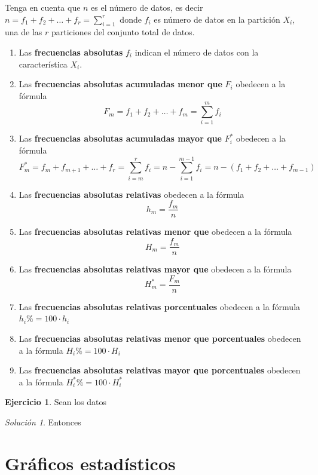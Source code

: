 \documentclass[10pt,]{krantz}
\theoremstyle{definition}
\theoremstyle{definition}
\theoremstyle{definition}
\newtheorem{exercise}{Ejercicio}[chapter]
\theoremstyle{definition}
\theoremstyle{remark}
\newtheorem*{solution}{Solución}
\begin{document}
Tenga en cuenta que \(n\) es el número de datos, es decir \(n=f_1+f_2+\ldots+f_r=\sum_{i=1}^r\) donde \(f_i\) es número de datos en la partición \(X_i\), una de las \(r\) particiones del conjunto total de datos.

\begin{enumerate}
\def\labelenumi{\arabic{enumi}.}
\item
  Las \textbf{frecuencias absolutas} \(f_i\) indican el número de datos con la característica \(X_i\).
\item
  Las \textbf{frecuencias absolutas acumuladas menor que} \(F_i\) obedecen a la fórmula
  \[F_m=f_1+f_2+\ldots+f_m=\sum_{i=1}^mf_i\]
\item
  Las \textbf{frecuencias absolutas acumuladas mayor que} \(F_i^*\) obedecen a la fórmula
  \[F_m^*=f_m+f_{m+1}+\ldots+f_r=\sum_{i=m}^rf_i=n-\sum_{i=1}^{m-1}f_i=n-\left(f_1+f_{2}+\ldots+f_{m-1}\right)\]
\item
  Las \textbf{frecuencias absolutas relativas} obedecen a la fórmula
  \[h_m=\frac{f_m}{n}\]
\item
  Las \textbf{frecuencias absolutas relativas menor que} obedecen a la fórmula
  \[H_m=\frac{f_m}{n}\]
\item
  Las \textbf{frecuencias absolutas relativas mayor que} obedecen a la fórmula
  \[H_m^*=\frac{F_m}{n}\]
\item
  Las \textbf{frecuencias absolutas relativas porcentuales} obedecen a la fórmula
  \(h_i\%=100\cdot h_i\)
\item
  Las \textbf{frecuencias absolutas relativas menor que porcentuales} obedecen a la fórmula
  \(H_i\%=100\cdot H_i\)
\item
  Las \textbf{frecuencias absolutas relativas mayor que porcentuales} obedecen a la fórmula
  \(H_i^*\%=100\cdot H_i^*\)
\end{enumerate}

\begin{exercise}
\protect\hypertarget{exr:unnamed-chunk-1}{}{\label{exr:unnamed-chunk-1} }Sean los datos
\end{exercise}

\begin{solution}
{}Entonces
\end{solution}

\hypertarget{gruxe1ficos-estaduxedsticos}{%
\chapter{Gráficos estadísticos}\label{gruxe1ficos-estaduxedsticos}}
\end{document}
